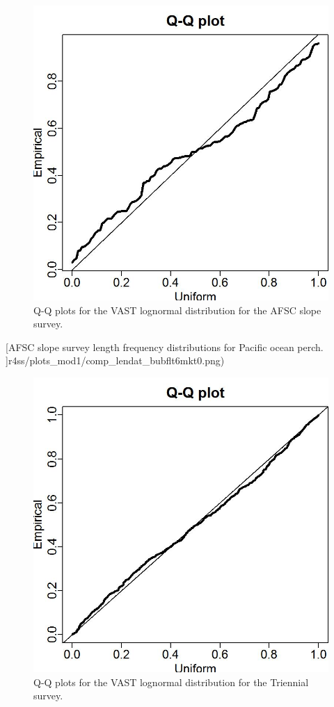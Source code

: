 \documentclass[12pt,]{article}
\begin{document}
\begin{figure}
\centering
\includegraphics{Figures/Q-Q_plot_afsc.jpg}
\caption{Q-Q plots for the VAST lognormal distribution for the AFSC
slope survey. \label{fig:afsc_qq}}
\end{figure}

\FloatBarrier

{[}AFSC slope survey length frequency distributions for Pacific ocean
perch.
\label{fig:afsc_Length}{]}r4ss/plots\_mod1/comp\_lendat\_bubflt6mkt0.png)

\FloatBarrier

\begin{figure}
\centering
\includegraphics{Figures/Q-Q_plot_triennial.jpg}
\caption{Q-Q plots for the VAST lognormal distribution for the Triennial
survey. \label{fig:tri_qq}}
\end{figure}
\end{document}
